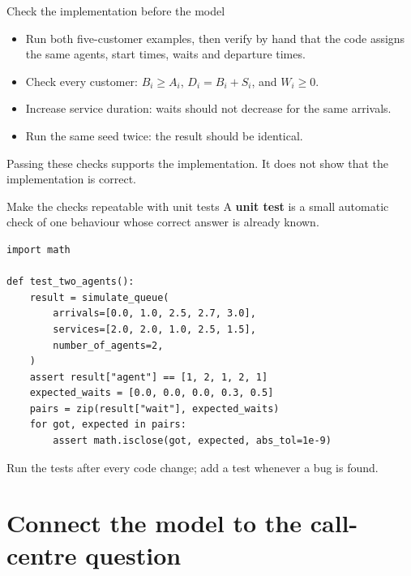 \documentclass{beamer}
\begin{document}
\begin{frame}{Check the implementation before the model}
  \begin{itemize}
    \item Run both five-customer examples, then verify by hand that the code assigns the same agents, start times, waits and departure times.
    \item Check every customer: $B_i\ge A_i$, $D_i=B_i+S_i$, and $W_i\ge0$.
    \item Increase service duration: waits should not decrease for the same arrivals.
    \item Run the same seed twice: the result should be identical.
  \end{itemize}
  \vspace{0.5em}
  Passing these checks supports the implementation. It does not show that the implementation is correct.
\end{frame}

\begin{frame}[fragile]{Make the checks repeatable with unit tests}
  \footnotesize
  A \textbf{unit test} is a small automatic check of one behaviour whose
  correct answer is already known.

  \vspace{0.4em}
\begin{verbatim}
import math

def test_two_agents():
    result = simulate_queue(
        arrivals=[0.0, 1.0, 2.5, 2.7, 3.0],
        services=[2.0, 2.0, 1.0, 2.5, 1.5],
        number_of_agents=2,
    )
    assert result["agent"] == [1, 2, 1, 2, 1]
    expected_waits = [0.0, 0.0, 0.0, 0.3, 0.5]
    pairs = zip(result["wait"], expected_waits)
    for got, expected in pairs:
        assert math.isclose(got, expected, abs_tol=1e-9)
\end{verbatim}

  \vspace{0.25em}
  Run the tests after every code change; add a test whenever a bug is found.
\end{frame}

\section{Connect the model to the call-centre question}
\end{document}
